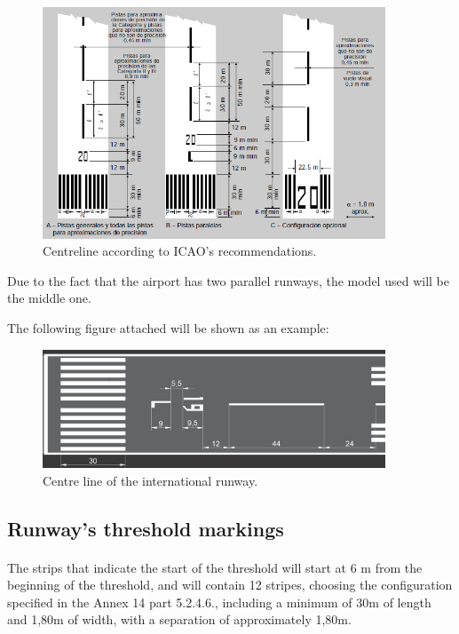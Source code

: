 		\begin{figure}[H]
			\centering
			\includegraphics[clip, trim=0cm 0cm 0cm 0cm, width=0.911\textwidth]{./images/markings/centreline}
			\caption{Centreline according to ICAO's recommendations.} %
			\label{} %
		\end{figure}
	
		Due to the fact that the airport has two parallel runways, the model used will be the middle one. 
		
		The following figure attached will be shown as an example:
		
		\begin{figure}[H]
			\centering
			\includegraphics[clip, trim=0cm 0cm 0cm 0cm, 	width=0.911\textwidth]{./images/markings/centreexample}
			\caption{Centre line of the international runway.} %
			\label{} %
		\end{figure}
		
		\subsection{Runway's threshold markings}
		\paragraph{}The strips that indicate the start of the threshold will start at 6 m from the beginning of the threshold, and will contain 12 stripes, choosing the configuration specified in the Annex 14 part 5.2.4.6., including a minimum of 30m of length and 1,80m of width, with a separation of approximately 1,80m.
		
